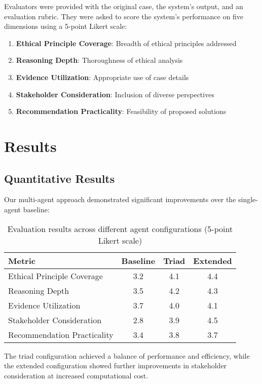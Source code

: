 \documentclass[11pt]{article}
\begin{document}
Evaluators were provided with the original case, the system's output, and an evaluation rubric. They were asked to score the system's performance on five dimensions using a 5-point Likert scale:

\begin{enumerate}
    \item \textbf{Ethical Principle Coverage}: Breadth of ethical principles addressed
    \item \textbf{Reasoning Depth}: Thoroughness of ethical analysis
    \item \textbf{Evidence Utilization}: Appropriate use of case details
    \item \textbf{Stakeholder Consideration}: Inclusion of diverse perspectives
    \item \textbf{Recommendation Practicality}: Feasibility of proposed solutions
\end{enumerate}

\section{Results}

\subsection{Quantitative Results}

Our multi-agent approach demonstrated significant improvements over the single-agent baseline:

\begin{table}[t]
\centering
\begin{tabular}{lccc}
\hline
\textbf{Metric} & \textbf{Baseline} & \textbf{Triad} & \textbf{Extended} \\
\hline
Ethical Principle Coverage & 3.2 & 4.1 & 4.4 \\
Reasoning Depth & 3.5 & 4.2 & 4.3 \\
Evidence Utilization & 3.7 & 4.0 & 4.1 \\
Stakeholder Consideration & 2.8 & 3.9 & 4.5 \\
Recommendation Practicality & 3.4 & 3.8 & 3.7 \\
\hline
\end{tabular}
\caption{Evaluation results across different agent configurations (5-point Likert scale)}
\label{tab:results}
\end{table}

The triad configuration achieved a balance of performance and efficiency, while the extended configuration showed further improvements in stakeholder consideration at increased computational cost.
\end{document}

